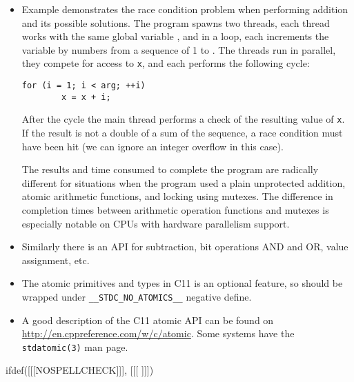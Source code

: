 \begin{itemize}
\item {} Example  demonstrates
the race condition problem when performing addition and its possible solutions.
The program spawns two threads, each thread works with the same global variable
, and in a loop, each increments the variable by numbers from a sequence
of 1 to .  The threads run in parallel, they compete for
access to \texttt{x}, and each performs the following cycle:

\begin{verbatim}
for (i = 1; i < arg; ++i)
        x = x + i;
\end{verbatim}

After the cycle the main thread performs a check of the resulting value of
\texttt{x}.   If the result is not a double of a sum of the sequence, a race
condition must have been hit (we can ignore an integer overflow in this case).
\par The results and time consumed to complete the program are radically
different for situations when the program used a plain unprotected addition,
atomic arithmetic functions, and locking using mutexes.  The difference in
completion times between arithmetic operation functions and mutexes is
especially notable on CPUs with hardware parallelism support.
\item Similarly there is an API for subtraction, bit operations AND and OR,
value assignment, etc.
\item The atomic primitives and types in C11 is an optional feature, so should
be wrapped under \texttt{\_\_STDC\_NO\_ATOMICS\_\_} negative define.
\item A good description of the C11 atomic API can be found on
\url{http://en.cppreference.com/w/c/atomic}. Some systems have the
\texttt{stdatomic(3)} man page.
\end{itemize}



ifdef([[[NOSPELLCHECK]]], [[[
]]])

